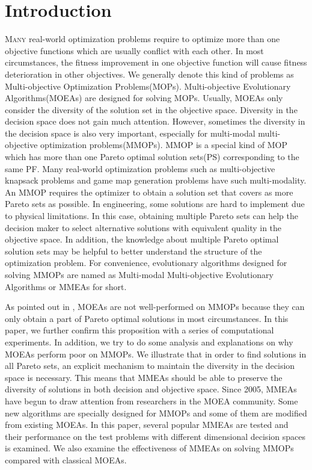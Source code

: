 \documentclass[conference]{IEEEtran}
\begin{document}
\section{Introduction}
\lettrine[lines=2]{M}{any} real-world optimization problems require to optimize more than one objective functions which are usually conflict with each other. In most circumstances, the fitness improvement in one objective function will cause fitness deterioration in other objectives. We generally denote this kind of problems as Multi-objective Optimization Problems(MOPs). Multi-objective Evolutionary Algorithms(MOEAs) are designed for solving MOPs. Usually, MOEAs only consider the diversity of the solution set in the objective space. Diversity in the decision space does not gain much attention. However, sometimes the diversity in the decision space is also very important, especially for multi-modal multi-objective optimization problems(MMOPs). MMOP is a special kind of MOP which has more than one Pareto optimal solution sets(PS) corresponding to the same PF. Many real-world optimization problems such as multi-objective knapsack problems \cite{jaszkiewicz2002performance} and game map generation problems \cite{togelius2010towards} have such multi-modality. An MMOP requires the optimizer to obtain a solution set that covers as more Pareto sets as possible. In engineering, some solutions are hard to implement due to physical limitations. In this case, obtaining multiple Pareto sets can help the decision maker to select alternative solutions with equivalent quality in the objective space. In addition, the knowledge about multiple Pareto optimal solution sets may be helpful to better understand the structure of the optimization problem\cite{deb2001multi}. For convenience, evolutionary algorithms designed for solving MMOPs are named as Multi-modal Multi-objective Evolutionary Algorithms or MMEAs for short.

As pointed out in \cite{tanabe2019review} \cite{liang2016multimodal}, MOEAs are not well-performed on MMOPs because they can only obtain a part of Pareto optimal solutions in most circumstances. In this paper, we further confirm this proposition with a series of computational experiments. In addition, we try to do some analysis and explanations on why MOEAs perform poor on MMOPs. We illustrate that in order to find solutions in all Pareto sets, an explicit mechanism to maintain the diversity in the decision space is necessary. This means that MMEAs should be able to preserve the diversity of solutions in both decision and objective space. Since 2005, MMEAs have begun to draw attention from researchers in the MOEA community. Some new algorithms are specially designed for MMOPs and some of them are modified from existing MOEAs. In this paper, several popular MMEAs are tested and their performance on the test problems with different dimensional decision spaces is examined. We also examine the effectiveness of MMEAs on solving MMOPs compared with classical MOEAs.
\end{document}
